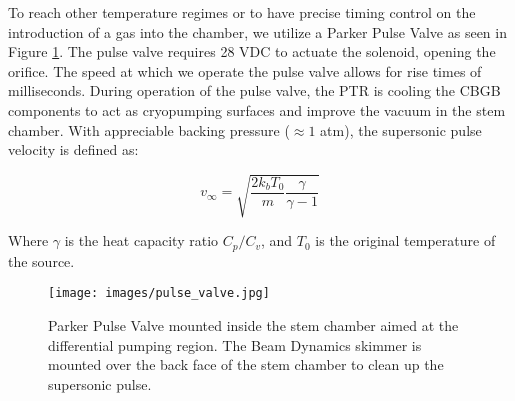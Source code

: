 To reach other temperature regimes or to have precise timing control on the introduction of a gas into the chamber, we utilize a Parker Pulse Valve as seen in Figure \ref{fig: general valve}. The pulse valve requires 28 VDC to actuate the solenoid, opening the orifice. The speed at which we operate the pulse valve allows for rise times of milliseconds. During operation of the pulse valve, the PTR is cooling the CBGB components to act as cryopumping surfaces and improve the vacuum in the stem chamber. With appreciable backing pressure ($\approx 1$ atm), the supersonic pulse velocity is defined as:\cite{Pauly}

\begin{equation}
	v_\infty = \sqrt{\frac{2 k_b T_0}{m}\frac{\gamma}{\gamma - 1}} \label{eq: v_infty}
\end{equation}

Where $\gamma$ is the heat capacity ratio $C_p/C_v$, and $T_0$ is the original temperature of the source.

\begin{figure}
	\centering
	\texttt{[image: images/pulse\_valve.jpg]}
	\caption{Parker Pulse Valve mounted inside the stem chamber aimed at the differential pumping region. The Beam Dynamics skimmer is mounted over the back face of the stem chamber to clean up the supersonic pulse.}
	\label{fig: general valve}
\end{figure}